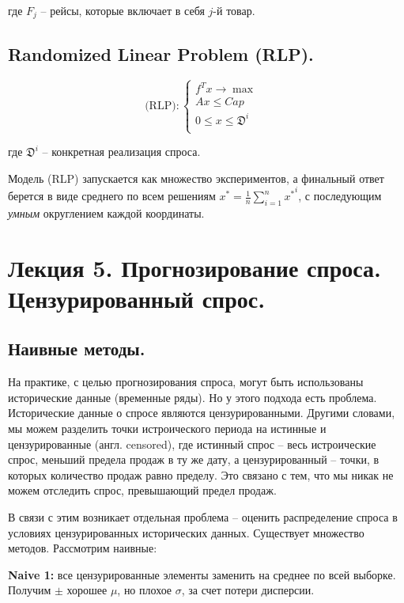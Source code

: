 \documentclass[reqno]{article}
\theoremstyle{definition}
\theoremstyle{definition}
\theoremstyle{definition}
\theoremstyle{definition}
\theoremstyle{definition}
\theoremstyle{definition}
\theoremstyle{definition}
\theoremstyle{definition}
\theoremstyle{definition}
\begin{document}
		где $F_j$ -- рейсы, которые включает в себя $j$-й товар.
		
		\subsection{Randomized Linear Problem (RLP).}
		
		$$
		\text{(RLP)}:
		\begin{cases}
			f^Tx \rightarrow \max & \\
			Ax \leq Cap & \\
			0 \leq x \leq \mathfrak{D}^i & \\
		\end{cases}	
		$$
		
		где $\mathfrak{D}^i$ -- конкретная реализация спроса.
		
		Модель (RLP) запускается как множество экспериментов, а финальный ответ берется в виде среднего по всем решениям $x^* = \frac{1}{n}\sum\limits^n_{i = 1} {x^*}^i$, с последующим \textit{умным} округлением каждой координаты.
		
		
		
		\newpage
		\section{Лекция 5. Прогнозирование спроса. Цензурированный спрос.}
		
		\subsection{Наивные методы.}
		
		На практике, с целью прогнозирования спроса, могут быть использованы исторические данные (временные ряды). Но у этого подхода есть проблема. Исторические данные о спросе являются цензурированными. Другими словами, мы можем разделить точки истроического периода на истинные и цензурированные (англ. censored), где истинный спрос -- весь истроические спрос, меньший предела продаж в ту же дату, а цензурированный -- точки, в которых количество продаж равно пределу. Это связано с тем, что мы никак не можем отследить спрос, превышающий предел продаж.
		
		В связи с этим возникает отдельная проблема -- оценить распределение спроса в условиях цензурированных исторических данных. Существует множество методов. Рассмотрим наивные:
		
		\textbf{Naive 1:} все цензурированные элементы заменить на среднее по всей выборке. Получим $\pm$ хорошее $\mu$, но плохое $\sigma$, за счет потери дисперсии.
		
\end{document}
